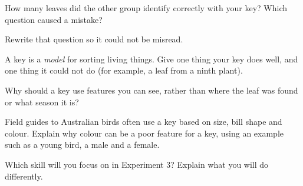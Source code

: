 
\task How many leaves did the other group identify correctly with your key? Which question caused a mistake? 
\answerbox{4cm}

\task Rewrite that question so it could not be misread.
\answerbox{3cm}

\task A key is a \emph{model} for sorting living things. Give one thing your key does well, and one thing it could not do (for example, a leaf from a ninth plant). 
\answerbox{4cm}

\task Why should a key use features you can see, rather than where the leaf was found or what season it is?
\answerbox{4cm}

\begin{yr8box}
\begin{keepext}
\exttask Field guides to Australian birds often use a key based on size, bill shape and colour. Explain why colour can be a poor feature for a key, using an example such as a young bird, a male and a female.
\answerbox{5cm}
\end{keepext}
\end{yr8box}


\begin{skillcheck}
\end{skillcheck}

\task Which skill will you focus on in Experiment 3? Explain what you will do differently.
\answerbox{5cm}
